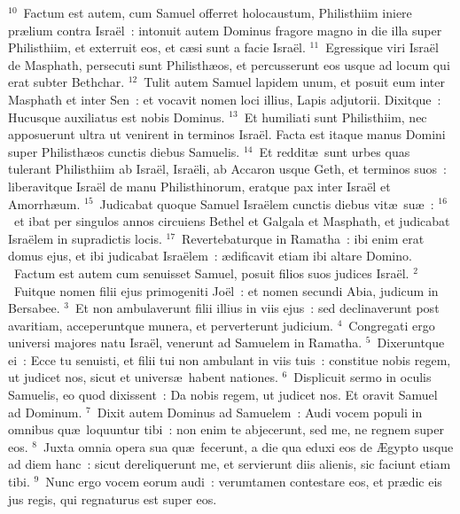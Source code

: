 ${}^{10}$~Factum est autem, cum Samuel offerret holocaustum, Philisthiim iniere pr\ae lium contra Isra\"el~: intonuit autem Dominus fragore magno in die illa super Philisthiim, et exterruit eos, et c\ae si sunt a facie Isra\"el.
${}^{11}$~Egressique viri Isra\"el de Masphath, persecuti sunt Philisth\ae os, et percusserunt eos usque ad locum qui erat subter Bethchar.
${}^{12}$~Tulit autem Samuel lapidem unum, et posuit eum inter Masphath et inter Sen~: et vocavit nomen loci illius, Lapis adjutorii. Dixitque~: Hucusque auxiliatus est nobis Dominus.
${}^{13}$~Et humiliati sunt Philisthiim, nec apposuerunt ultra ut venirent in terminos Isra\"el. Facta est itaque manus Domini super Philisth\ae os cunctis diebus Samuelis.
${}^{14}$~Et reddit\ae\ sunt urbes quas tulerant Philisthiim ab Isra\"el, Isra\"eli, ab Accaron usque Geth, et terminos suos~: liberavitque Isra\"el de manu Philisthinorum, eratque pax inter Isra\"el et Amorrh\ae um.
${}^{15}$~Judicabat quoque Samuel Isra\"elem cunctis diebus vit\ae\ su\ae~:
${}^{16}$~et ibat per singulos annos circuiens Bethel et Galgala et Masphath, et judicabat Isra\"elem in supradictis locis.
${}^{17}$~Revertebaturque in Ramatha~: ibi enim erat domus ejus, et ibi judicabat Isra\"elem~: \ae dificavit etiam ibi altare Domino.
~\lettrine[lines=10,image=true,loversize=0.05,lraise=-0.03]{F}{}actum est autem cum senuisset Samuel, posuit filios suos judices Isra\"el.
${}^{2}$~Fuitque nomen filii ejus primogeniti Jo\"el~: et nomen secundi Abia, judicum in Bersabee.
${}^{3}$~Et non ambulaverunt filii illius in viis ejus~: sed declinaverunt post avaritiam, acceperuntque munera, et perverterunt judicium.
${}^{4}$~Congregati ergo universi majores natu Isra\"el, venerunt ad Samuelem in Ramatha.
${}^{5}$~Dixeruntque ei~: Ecce tu senuisti, et filii tui non ambulant in viis tuis~: constitue nobis regem, ut judicet nos, sicut et univers\ae\ habent nationes.
${}^{6}$~Displicuit sermo in oculis Samuelis, eo quod dixissent~: Da nobis regem, ut judicet nos. Et oravit Samuel ad Dominum.
${}^{7}$~Dixit autem Dominus ad Samuelem~: Audi vocem populi in omnibus qu\ae\ loquuntur tibi~: non enim te abjecerunt, sed me, ne regnem super eos.
${}^{8}$~Juxta omnia opera sua qu\ae\ fecerunt, a die qua eduxi eos de \AE gypto usque ad diem hanc~: sicut dereliquerunt me, et servierunt diis alienis, sic faciunt etiam tibi.
${}^{9}$~Nunc ergo vocem eorum audi~: verumtamen contestare eos, et pr\ae dic eis jus regis, qui regnaturus est super eos.


